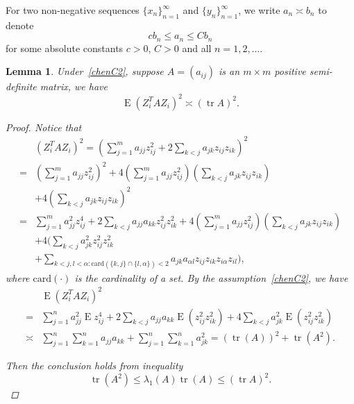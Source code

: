 \documentclass[review]{elsarticle}
\DeclareMathOperator{\mytr}{tr}
\DeclareMathOperator{\myE}{E}
\theoremstyle{plain}
\newtheorem{lemma}{Lemma}
\theoremstyle{definition}
\theoremstyle{remark}
\begin{document}
For two non-negative sequences $\{x_n\}_{n=1}^{\infty}$ and $\{y_n\}_{n=1}^{\infty}$, we write $a_n\asymp b_n$ to denote 
\begin{equation*}
cb_n\leq a_n\leq C b_n
\end{equation*}
for some absolute constants $c>0$, $C>0$ and all $n=1,2,\ldots$.
\begin{lemma}\label{lemmaQ}
    Under~\eqref{chenC2}, suppose $A=(a_{ij})$ is an $m\times m$ positive semi-definite matrix, we have
        \begin{equation*}
        \myE {(Z_i^T A Z_i)}^2\asymp {(\mytr A)}^2.
        \end{equation*}
\begin{proof}
Notice that
    \begin{equation*}
    \begin{aligned}
        &{(Z_i^T A Z_i)}^2
        =
        (\sum_{j=1}^m a_{jj}z_{ij}^2+2\sum_{k<j}a_{jk}z_{ij}z_{ik})^2\\
        =&
        (\sum_{j=1}^m a_{jj}z_{ij}^2)^2+
        4(\sum_{j=1}^m a_{jj}z_{ij}^2)(\sum_{k<j}a_{jk}z_{ij}z_{ik})\\
        &+
        4(\sum_{k<j}a_{jk}z_{ij}z_{ik})^2\\
        =&
        \sum_{j=1}^m a_{jj}^2z_{ij}^4+2\sum_{k<j}a_{jj}a_{kk}z_{ij}^2 z_{ik}^2+
        4(\sum_{j=1}^m a_{jj}z_{ij}^2)(\sum_{k<j}a_{jk}z_{ij}z_{ik})\\
        &+
        4\Big(\sum_{k<j}a_{jk}^2z_{ij}^2z_{ik}^2\\
        &+\sum_{k<j,l<\alpha:\mathrm{card}(\{k,j\}\cap\{l,\alpha\})<2} a_{jk}a_{\alpha l}z_{ij}z_{ik}z_{i\alpha}z_{il}\Big),
    \end{aligned}
    \end{equation*}
    where $\mathrm{card}(\cdot)$ is the cardinality of a set.
    By the assumption~\eqref{chenC2}, we have
    \begin{equation*}
    \begin{aligned}
        &\myE{(Z_i^T A Z_i)}^2\\
        =&
        \sum_{j=1}^n a_{jj}^2 \myE z_{ij}^4+2\sum_{k<j}a_{jj}a_{kk}\myE(z_{ij}^2 z_{ik}^2)+
        4\sum_{k<j}a_{jk}^2 \myE(z_{ij}^2z_{ik}^2)\\
        \asymp &
        \sum_{j=1}^n\sum_{k=1}^n a_{jj}a_{kk}+
        \sum_{j=1}^n\sum_{k=1}^n a_{jk}^2
        ={(\mytr (A))}^2+\mytr ( A^2).
    \end{aligned}
    \end{equation*}

     Then the conclusion holds from inequality
     \begin{equation*}
     \mytr ( A^2)\leq \lambda_1 (A) \mytr(A)\leq {(\mytr A)}^2.
     \end{equation*}

\end{proof}
\end{lemma}
\end{document}
